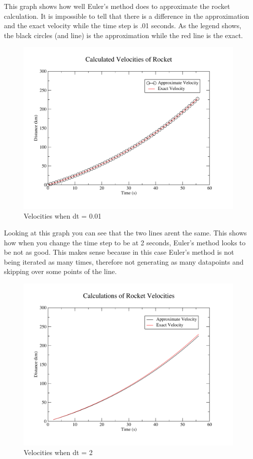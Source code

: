 \documentclass[11pt]{article}
\begin{document}
This graph shows how well Euler's method does to approximate the rocket calculation. It is impossible to tell that there is a difference in the approximation and the exact velocity while the time step is .01 seconds. As the legend shows, the black circles (and line) is the approximation while the red line is the exact.
\begin{figure}[H]
\centering
\includegraphics[scale=0.45]{velocity01.pdf}
\caption{Velocities when dt = 0.01}
\end{figure}
\newpage
Looking at this graph you can see that the two lines arent the same. This shows how when you change the time step to be at 2 seconds, Euler's method looks to be not as good. This makes sense because in this case Euler's method is not being iterated as many times, therefore not generating as many datapoints and skipping over some points of the line.
\begin{figure}[H]
\centering
\includegraphics[scale=0.45]{velocity2.pdf}
\caption{Velocities when dt = 2}
\end{figure}
\end{document}

